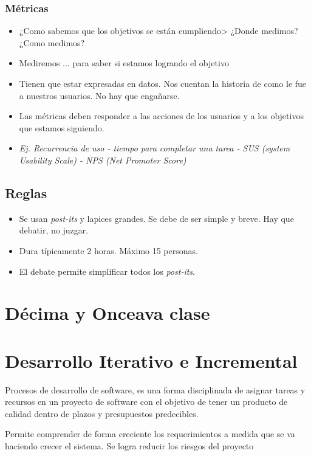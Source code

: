 \documentclass[titlepage,a4paper]{article}
\begin{document}
\subsubsection*{Métricas}

\begin{itemize}
    \item ¿Como sabemos que los objetivos se están cumpliendo> ¿Donde medimos? ¿Como medimos?
    \item Mediremos ... para saber si estamos logrando el objetivo
    \item Tienen que estar expresadas en datos. Nos cuentan la historia de como le fue a nuestros usuarios. No hay que engañarse.
    \item Las métricas deben responder a las acciones de los usuarios y a los objetivos que estamos siguiendo.
    \item \textit{Ej. Recurrencia de uso - tiempo para completar una tarea - SUS (system Usability Scale) - NPS (Net Promoter Score)}
\end{itemize}

\subsection{Reglas}
\begin{itemize}
    \item Se usan \textit{post-its} y lapices grandes. Se debe de ser simple y breve. Hay que debatir, no juzgar.
    \item Dura típicamente 2 horas. Máximo 15 personas.
    \item El debate permite simplificar todos los \emph{post-its}.
\end{itemize}

\section*{Décima y Onceava clase}


\section{Desarrollo Iterativo e Incremental}

Procesos de desarrollo de software, es una forma disciplinada de asignar tareas y recursos en un proyecto de software con el objetivo de tener un producto de calidad dentro de plazos y presupuestos predecibles.

Permite comprender de forma creciente los requerimientos a medida que se va haciendo crecer el sistema. Se logra reducir los riesgos del proyecto
\end{document}
